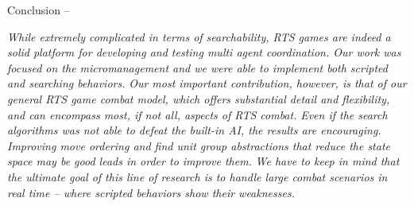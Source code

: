 \begin{bfseries} Conclusion -- \end{bfseries}
\emph{While extremely complicated in terms of searchability, RTS games are indeed a solid platform for developing and testing multi agent coordination. Our work was focused on the micromanagement and we were able to implement both scripted and searching behaviors.}
\emph{Our most important contribution, however, is that of our general RTS game combat model, which offers substantial detail and flexibility, and can encompass most, if not all, aspects of RTS combat.}
\emph{Even if the search algorithms was not able to defeat the built-in AI, the results are encouraging. Improving move ordering and find unit group abstractions that reduce the state space may be good leads in order to improve them.}
\emph{We have to keep in mind that the ultimate goal of this line of research is to handle large combat scenarios in real time -- where scripted behaviors show their weaknesses.}
